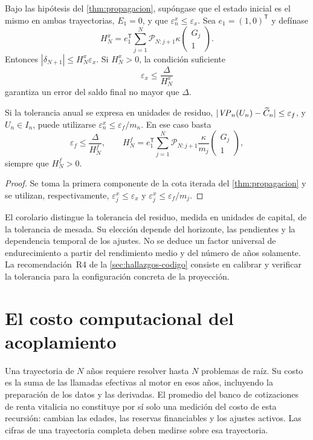 \begin{corollary}
\label{cor:tolerancia-rp}
Bajo las hipótesis del \cref{thm:propagacion}, supóngase que el estado inicial
es el mismo en ambas trayectorias, $E_1=0$, y que
$\varepsilon_n^x\le\varepsilon_x$. Sea $e_1=(1,0)^{\mathsf T}$ y defínase
\[
 H_N^x=e_1^{\mathsf T}
 \sum_{j=1}^{N}\mathcal P_{N:j+1}
       \kappa\begin{pmatrix}G_j\\1\end{pmatrix}.
\]
Entonces $|\delta_{N+1}|\le H_N^x\varepsilon_x$. Si $H_N^x>0$, la condición
suficiente
\[
  \varepsilon_x\le\frac{\Delta}{H_N^x}
\]
garantiza un error del saldo final no mayor que $\Delta$.

Si la tolerancia anual se expresa en unidades de residuo,
$|\mathit{VP}_n(U_n)-\widetilde C_n|\le\varepsilon_f$, y $U_n\in I_n$,
puede utilizarse $\varepsilon_n^x\le\varepsilon_f/m_n$. En ese caso basta
\[
 \varepsilon_f\le\frac{\Delta}{H_N^f},\qquad
 H_N^f=e_1^{\mathsf T}
 \sum_{j=1}^{N}\mathcal P_{N:j+1}
       \frac{\kappa}{m_j}\begin{pmatrix}G_j\\1\end{pmatrix},
\]
siempre que $H_N^f>0$.
\end{corollary}
\begin{proof}
Se toma la primera componente de la cota iterada del
\cref{thm:propagacion} y se utilizan, respectivamente,
$\varepsilon_j^x\le\varepsilon_x$ y
$\varepsilon_j^x\le\varepsilon_f/m_j$.
\end{proof}

El corolario distingue la tolerancia del residuo, medida en unidades de
capital, de la tolerancia de mesada. Su elección depende del horizonte,
las pendientes y la dependencia temporal de los ajustes. No se deduce un
factor universal de endurecimiento a partir del rendimiento medio y del
número de años solamente. La recomendación~R4 de la
\cref{sec:hallazgos-codigo} consiste en calibrar y verificar la tolerancia
para la configuración concreta de la proyección.

\section{El costo computacional del acoplamiento}

Una trayectoria de $N$ años requiere resolver hasta $N$ problemas de raíz.
Su costo es la suma de las llamadas efectivas al motor en esos años, incluyendo
la preparación de los datos y las derivadas. El promedio del banco de
cotizaciones de renta vitalicia no constituye por sí solo una medición del
costo de esta recursión: cambian las edades, las reservas financiables y
los ajustes activos. Las cifras de una trayectoria completa deben medirse
sobre esa trayectoria.

